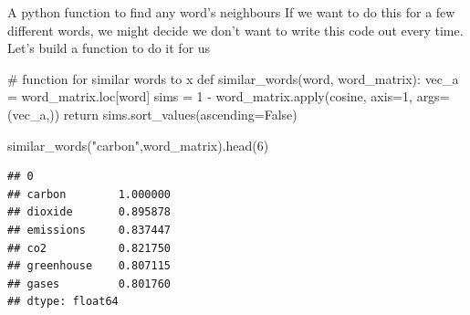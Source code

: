 \documentclass[
  10pt,
  ignorenonframetext,
  aspectratio=169]{beamer}
\newenvironment{Shaded}{\begin{snugshade}}{\end{snugshade}}
\newcommand{\BuiltInTok}[1]{\textcolor[rgb]{0.80,0.80,0.80}{#1}}
\newcommand{\CommentTok}[1]{\textcolor[rgb]{0.50,0.62,0.50}{#1}}
\newcommand{\ControlFlowTok}[1]{\textcolor[rgb]{0.94,0.87,0.69}{#1}}
\newcommand{\DecValTok}[1]{\textcolor[rgb]{0.86,0.86,0.80}{#1}}
\newcommand{\KeywordTok}[1]{\textcolor[rgb]{0.94,0.87,0.69}{#1}}
\newcommand{\NormalTok}[1]{\textcolor[rgb]{0.80,0.80,0.80}{#1}}
\newcommand{\OperatorTok}[1]{\textcolor[rgb]{0.94,0.94,0.82}{#1}}
\newcommand{\StringTok}[1]{\textcolor[rgb]{0.80,0.58,0.58}{#1}}
\newcommand{\VariableTok}[1]{\textcolor[rgb]{0.80,0.80,0.80}{#1}}
\begin{document}
\begin{frame}[fragile]{A python function to find any word's neighbours}
\protect\hypertarget{a-python-function-to-find-any-words-neighbours}{}
If we want to do this for a few different words, we might decide we
don't want to write this code out every time. Let's build a function to
do it for us

\medskip

\scriptsize

\begin{Shaded}
\begin{Highlighting}[]

\CommentTok{\# function for similar words to x}
\KeywordTok{def}\NormalTok{ similar\_words(word, word\_matrix):}
\NormalTok{    vec\_a }\OperatorTok{=}\NormalTok{ word\_matrix.loc[word]}
\NormalTok{    sims }\OperatorTok{=} \DecValTok{1} \OperatorTok{{-}}\NormalTok{ word\_matrix.}\BuiltInTok{apply}\NormalTok{(cosine, axis}\OperatorTok{=}\DecValTok{1}\NormalTok{, args}\OperatorTok{=}\NormalTok{(vec\_a,))}
    \ControlFlowTok{return}\NormalTok{ sims.sort\_values(ascending}\OperatorTok{=}\VariableTok{False}\NormalTok{)}

\NormalTok{similar\_words(}\StringTok{"carbon"}\NormalTok{,word\_matrix).head(}\DecValTok{6}\NormalTok{)}
\end{Highlighting}
\end{Shaded}

\begin{verbatim}
## 0
## carbon        1.000000
## dioxide       0.895878
## emissions     0.837447
## co2           0.821750
## greenhouse    0.807115
## gases         0.801760
## dtype: float64
\end{verbatim}
\end{frame}
\end{document}
